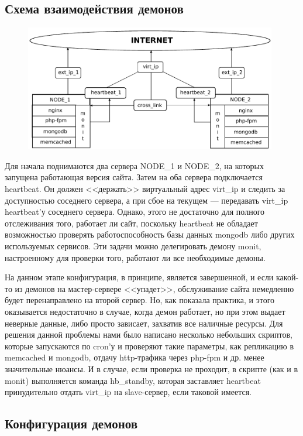 \documentclass[10pt, a5paper]{article}
\begin{document}
\subsection*{Схема взаимодействия демонов}

\begin{figure}[h!]
  \centering
  \includegraphics[width=11cm]{01_2012_heartbeat}
  \label{fig:Volkovich1}
\end{figure}

Для начала поднимаются два сервера NODE\_1 и NODE\_2, на которых запущена работающая версия сайта. Затем на оба сервера подключается heartbeat. Он должен <<держать>> виртуальный адрес virt\_ip и следить за доступностью соседнего сервера, а при сбое на текущем --- передавать virt\_ip heartbeat'у соседнего сервера. Однако, этого не достаточно для полного отслеживания того, работает ли сайт, поскольку heartbeat не обладает возможностью проверять работоспособность базы данных mongodb либо других используемых сервисов. Эти задачи можно делегировать демону monit, настроенному для проверки того, работают ли все необходимые демоны.

На данном этапе конфигурация, в принципе, является завершенной, и если какой-то из демонов на мастер-сервере <<упадет>>, обслуживание сайта немедленно будет перенаправлено на второй сервер. Но, как показала практика, и этого оказывается недостаточно в случае, когда демон работает, но при этом выдает неверные данные, либо просто зависает, захватив все наличные ресурсы. Для решения данной проблемы нами было написано несколько небольших скриптов, которые запускаются по cron'у и проверяют такие параметры, как репликацию в memcached и mongodb, отдачу http-трафика через php-fpm и др. менее значительные нюансы. И в случае, если проверка не проходит, в скрипте (как и в monit) выполняется команда hb\_standby, которая заставляет heartbeat принудительно отдать virt\_ip на slave-сервер, если таковой имеется.

\subsection*{Конфигурация демонов}
\end{document}
